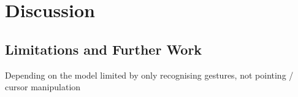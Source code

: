 \section{Discussion} %






\subsection{Limitations and Further Work} %




Depending on the model limited by only recognising gestures, not pointing / cursor manipulation


